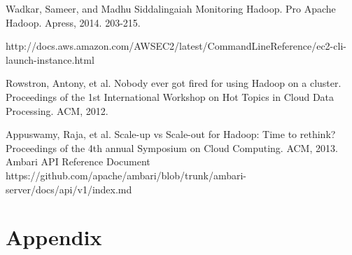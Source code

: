 \documentclass{article}
\begin{document}
\begin{thebibliography}{4}


Wadkar, Sameer, and Madhu Siddalingaiah
\newblock Monitoring Hadoop.
\newblock  Pro Apache Hadoop. Apress, 2014. 203-215.
\label{ref:wadkar}

http://docs.aws.amazon.com/AWSEC2/latest/CommandLineReference/ec2-cli-launch-instance.html

Rowstron, Antony, et al.
\newblock Nobody ever got fired for using Hadoop on a cluster.
\newblock  Proceedings of the 1st International Workshop on Hot Topics in Cloud Data Processing. ACM, 2012.

Appuswamy, Raja, et al.
\newblock Scale-up vs Scale-out for Hadoop: Time to rethink?
\newblock Proceedings of the 4th annual Symposium on Cloud Computing. ACM, 2013.
\label{ref:ambariAPI}
Ambari API Reference Document 
\newblock https://github.com/apache/ambari/blob/trunk/ambari-server/docs/api/v1/index.md


\end{thebibliography}

\section{Appendix}
\end{document}

